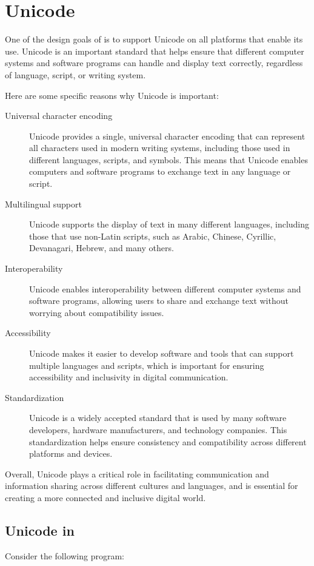\chapter{Unicode}
One of the design goals of \crexx{} is to support Unicode on all
platforms that enable its use. 
Unicode is an important standard that helps ensure that different computer systems and software programs can handle and display text correctly, regardless of language, script, or writing system.

Here are some specific reasons why Unicode is important:
\begin{description}
\item[Universal character encoding] Unicode provides a single, universal character encoding that can represent all characters used in modern writing systems, including those used in different languages, scripts, and symbols. This means that Unicode enables computers and software programs to exchange text in any language or script.
\item[Multilingual support] Unicode supports the display of text in many different languages, including those that use non-Latin scripts, such as Arabic, Chinese, Cyrillic, Devanagari, Hebrew, and many others.
\item[Interoperability] Unicode enables interoperability between different computer systems and software programs, allowing users to share and exchange text without worrying about compatibility issues.
\item[Accessibility] Unicode makes it easier to develop software and tools that can support multiple languages and scripts, which is important for ensuring accessibility and inclusivity in digital communication.
\item[Standardization] Unicode is a widely accepted standard that is
  used by many software developers, hardware manufacturers, and
  technology companies. This standardization helps ensure consistency
  and compatibility across different platforms and devices.
\end{description}
Overall, Unicode plays a critical role in facilitating communication
and information sharing across different cultures and languages, and
is essential for creating a more connected and inclusive digital
world.

\section{Unicode in \crexx{}}
Consider the following program:
 \setmainfont{Courier New}
 \newfontfamily{}
\newfontfamily{}
\setTransitionsForCJK{\mychinesefont}{\myregularfont}


\begin{shaded}
  \small
    \obeylines {}
\end{shaded}
 \setmainfont{TeX Gyre Pagella}